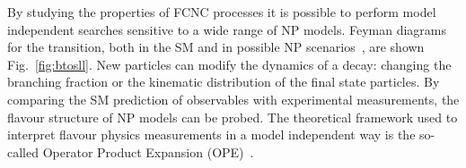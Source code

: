 By studying the properties of FCNC processes it is possible to perform model independent searches sensitive to a wide range of NP models. Feyman diagrams for the \btosll transition, both in the SM and in possible NP scenarios~\cite{bstoll-higgs,bstoll-zprime}, are shown Fig.~\ref{fig:btosll}. New particles can modify the dynamics of a decay: changing the branching fraction or the kinematic distribution of the final state particles. By comparing the SM prediction of observables with experimental measurements, the flavour structure of NP models can be probed. The theoretical framework used to interpret flavour physics measurements in a model independent way is the so-called Operator Product Expansion (OPE)~\cite{ope}.

\begin{figure}[!tb]
\centering
\begin{subfigure}{0.49\textwidth}
\caption{}
\label{fig:btosll:a}
\end{subfigure}
\begin{subfigure}{0.49\textwidth}
\begin{tikzpicture}

\end{tikzpicture}
\end{subfigure}
\end{figure}

